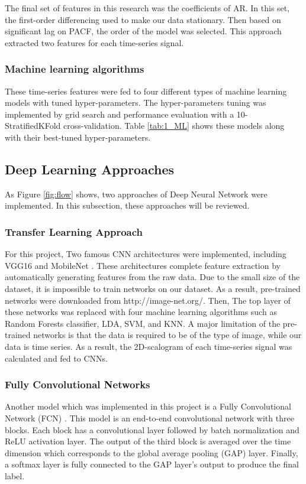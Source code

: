 The final set of features in this research was the coefficients of \gls{AR}. In this set, the first-order differencing used to make our data stationary. Then based on significant lag on \gls{PACF}, the order of the model  was selected. This approach extracted two features for each time-series signal.

\subsubsection{Machine learning algorithms}

These time-series features were fed to four different types of machine learning models with tuned hyper-parameters. The hyper-parameters tuning was implemented by grid search and performance evaluation with a 10-StratifiedKFold cross-validation. Table \ref{tab:1_ML} shows these models along with their best-tuned hyper-parameters.

\subsection{Deep Learning Approaches}
  
As Figure \ref{fig:flow} shows, two approaches of Deep Neural Network were implemented. In this subsection, these approaches will be reviewed.


\subsubsection{Transfer Learning Approach}
For this project, Two famous CNN architectures were implemented, including VGG16 \cite{Simonyan2015VeryRecognition} and MobileNet \cite{Howard2017MobileNets:Applications}. These architectures complete feature extraction by automatically generating features from the raw data. 
Due to the small size of the dataset, it is impossible to train networks on our dataset. As a result, pre-trained networks were downloaded from http://image-net.org/. Then, The top layer of these networks was replaced with four machine learning algorithms such as Random Forests classifier, LDA, SVM, and KNN. 
A major limitation of the pre-trained networks is that the data is required to be of the type of image, while our data is time series. As a result, the 2D-scalogram of each time-series signal was calculated and fed to CNNs. 



\subsubsection{Fully Convolutional Networks}
Another model which was implemented in this project is a Fully Convolutional Network (FCN) \cite{WangTimeBaseline}. This model is an end-to-end convolutional network with three blocks. Each block has a convolutional layer followed by batch normalization and ReLU activation layer. The output of the third block is averaged over the time dimension which corresponds to the global average pooling (GAP) layer. Finally, a softmax layer is fully connected to the GAP layer’s output to produce the final label.



